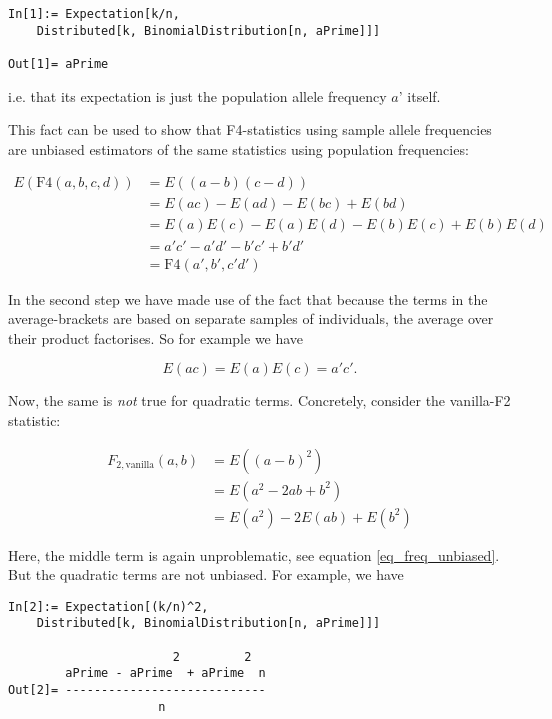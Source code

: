 \documentclass{article}
\begin{document}
\begin{lstlisting}
In[1]:= Expectation[k/n, 
    Distributed[k, BinomialDistribution[n, aPrime]]]

Out[1]= aPrime
\end{lstlisting}

i.e. that its expectation is just the population allele frequency \(a\){'} itself.

This fact can be used to show that F4-statistics using sample allele frequencies are unbiased estimators of the same statistics using population
frequencies:

\begin{equation}
\begin{split}
E\left( \text{F4}(a,b,c,d)\right) &=E((a-b)(c-d)) \\
&=E(ac) -E(ad) -E(bc) +E(bd) \\
&= E(a) E(c) -E(a) E(d) -E(b) E(c) +E(b) E(d) \\
&=a'c'-a'd'-b'c'+b'd'\\
&=\text{F4}(a',b',c'd')
\end{split}
\end{equation}

In the second step we have made use of the fact that because the terms in the average-brackets are based on separate samples of individuals, the
average over their product factorises. So for example we have 

\begin{equation}
\label{eq_freq_unbiased}
E(a c) =E(a) E(c) =a' c' .
\end{equation}

Now, the same is \textit{not} true for quadratic terms. Concretely, consider the vanilla-F2 statistic:

\begin{equation}
\begin{split}
F_{2,\text{vanilla}}(a,b)&=E\left((a-b)^2\right)\\
&= E\left(a^2-2a b+b^2\right)\\
&= E\left(a^2\right) -2E\left(a b\right)
+E(b^2)
\end{split}
\end{equation}

Here, the middle term is again unproblematic, see equation \ref{eq_freq_unbiased}. But the quadratic terms are not unbiased. For example, we have

\begin{lstlisting}
In[2]:= Expectation[(k/n)^2,                                                    
    Distributed[k, BinomialDistribution[n, aPrime]]]                            

                       2         2
        aPrime - aPrime  + aPrime  n
Out[2]= ----------------------------
                     n
\end{lstlisting}
\end{document}
